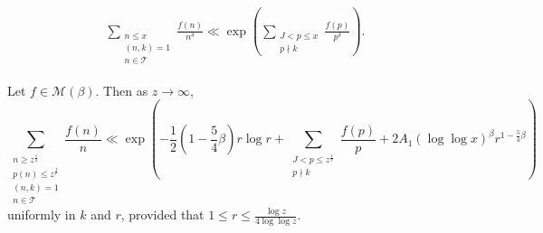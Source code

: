 \documentclass[10pt,a4paper]{amsart}
\begin{document}
\begin{align}\label{psum4simple}
\sum_{\substack{n\leq x \\ (n,k)=1 \\ n\in \mathcal T}}\frac{f(n)}{n^\delta}\ll \exp\left(\sum_{\substack{J<p\leq x \\ p\nmid k}}\frac{f(p)}{p^\delta}\right).
\end{align}

\begin{lemma}\label{lemmalogr}
Let $f\in \mathcal M(\beta)$.  Then as $z\to\infty$,
$$\sum_{\substack{n\geq z^\frac 12 \\ p(n)\leq z^\frac 1r \\ (n,k)=1 \\ n\in \mathcal T}}\frac{f(n)}{n}\ll \exp\left(-\frac 12\left(1-\frac{5}{4}\beta\right)r\log r+\sum_{\substack{J<p\leq z^\frac 1r \\ p\nmid k}}\frac{f(p)}{p}+2A_1 (\log\log x)^{\beta}r^{1-\frac{5}{4}\beta}\right)$$
uniformly in $k$ and $r$, provided that $1\leq r\leq \frac{\log z}{4\log\log z}$.
\end{lemma}
\end{document}
